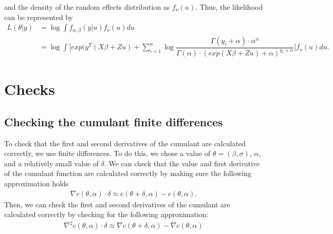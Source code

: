 \documentclass{article}
\begin{document}
        \noindent and the density of the random effects distribution as $f_\nu(u)$. Thus, the likelihood can be represented by 
        \begin{align}
        L(\theta|y) &= \log \int f_{\alpha,\beta}(y|u)f_\nu(u) du \\
        &= \log\int \Big[exp(y^T(X \beta + Z u) + \sum\limits_{i=1}^n \log \dfrac{\Gamma (y_i + \alpha) \cdot \alpha^\alpha}{\Gamma (\alpha) \cdot (exp(X \beta + Z u)+\alpha)^{y_i + \alpha}}\Big]  f_\nu(u)du.
        \end{align}
        \begin{comment}
        We then find the log-likelihood to be
        \begin{align}
        \log L(\theta|y) = y^T(X \beta + Z u) + \sum\limits_{i=1}^n \log \dfrac{\Gamma (y_i + \alpha) \cdot \alpha^\alpha}{\Gamma (\alpha) \cdot (exp(X \beta + Z u)+\alpha)^{y_i + \alpha}} + f_\nu(u) \\
        + f_U(u|\theta) + constant \nonumber
        \end{align}
        
        \noindent and the score vector to be
        \begin{align}
        S(\beta_j) &= \dfrac{\partial}{\partial\beta}[\log L(\theta|y)] \\
        &= \sum\limit_{i=1}^n \alpha X [\dfrac{y_i-exp(X\beta + Z u)}{exp(X\beta + Z u) + \alpha}] \\
        S(\alpha) &= \dfrac{\partial}{\partial\alpha}[\log L(\theta|y)] \\
        &= \sum\limits_{i=1}^n \psi(y_i + \alpha) - \psi(\alpha) + \log(\alpha) + 1 - \log(exp(X\beta + Z u) + \alpha) - \dfrac{y_i + \alpha}{exp(X\beta + Z u)+\alpha}
        \end{align}
        \noindent where $\psi(w)=\dfrac{\partial}{\partial w}\log\Gamma(w)$.
\end{comment}
\section{Checks}
    \subsection{Checking the cumulant finite differences}
    To check that the first and second derivatives of the cumulant are calculated correctly, we use finite differences. To do this, we chose a value of $\theta=(\beta,\sigma)$, $\alpha$, and a relatively small value of $\delta$. We can check that the value and first derivative of the cumulant function are calculated correctly by making sure the following approximation holds
    \begin{align}
    \nabla c (\theta, \alpha)  \cdot \delta \approx c(\theta+\delta, \alpha)-c(\theta, \alpha).
    \end{align} 
    Then, we can check the first and second derivatives of the cumulant are calculated correctly by checking for the following approximation:
    \begin{align}
    \nabla^2 c (\theta, \alpha) \cdot \delta \approx \nabla c (\theta+\delta, \alpha)-\nabla c (\theta, \alpha)
    \end{align}
\end{document}
